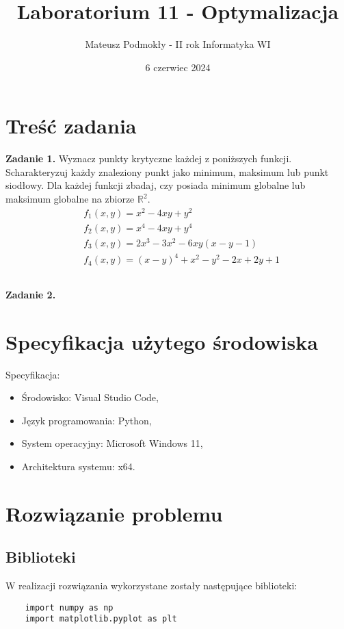 \documentclass[11pt, leqno]{scrartcl}
\title{Laboratorium 11 - Optymalizacja}
\author{Mateusz Podmokły - II rok Informatyka WI}
\date{6 czerwiec 2024}
\begin{document}
    \maketitle
    \section{Treść zadania}
    \textbf{Zadanie 1.} Wyznacz punkty krytyczne każdej z poniższych
    funkcji. Scharakteryzuj każdy znaleziony punkt jako minimum,
    maksimum lub punkt siodłowy. Dla każdej funkcji zbadaj, czy
    posiada minimum globalne lub maksimum globalne na zbiorze
    $\mathbb{R}^2$.
    \begin{align*}
        &f_1(x,y)=x^2-4xy+y^2 \\
        &f_2(x,y)=x^4-4xy+y^4 \\
        &f_3(x,y)=2x^3-3x^2-6xy(x-y-1) \\
        &f_4(x,y)=(x-y)^4+x^2-y^2-2x+2y+1
    \end{align*}

    \subsection*{}
    \textbf{Zadanie 2.}

    \section{Specyfikacja użytego środowiska}
    Specyfikacja:
    \begin{itemize}
        \item Środowisko: Visual Studio Code,
        \item Język programowania: Python,
        \item System operacyjny: Microsoft Windows 11,
        \item Architektura systemu: x64.
    \end{itemize}

    \section{Rozwiązanie problemu}
    \subsection{Biblioteki}
    W realizacji rozwiązania wykorzystane zostały następujące
    biblioteki:
    \begin{lstlisting}
    import numpy as np
    import matplotlib.pyplot as plt
    \end{lstlisting}

    \subsection{}
\end{document}
